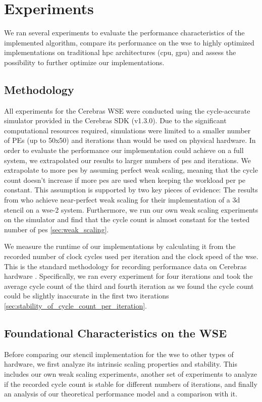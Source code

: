 \chapter{Experiments}
\label{sec:experiments}
We ran several experiments to evaluate the performance characteristics of the implemented algorithm, compare its performance on the \ac{wse} to highly optimized implementations on traditional \ac{hpc} architectures (\ac{cpu}, \ac{gpu}) and assess the possibility to further optimize our implementations.

\section{Methodology}
All experiments for the Cerebras WSE were conducted using the cycle-accurate simulator provided in the Cerebras SDK (v1.3.0).
Due to the significant computational resources required, simulations were limited to a smaller number of PEs (up to 50x50) and iterations than would be used on physical hardware.
In order to evaluate the performance our implementation could achieve on a full system, we extrapolated our results to larger numbers of \acp{pe} and iterations.
We extrapolate to more \acp{pe} by assuming perfect weak scaling, meaning that the cycle count doesn't increase if more \acp{pe} are used when keeping the workload per \ac{pe} constant.
This assumption is supported by two key pieces of evidence: The results from \citeauthor{jacquelin2022scalable} \cite{jacquelin2022scalable} who achieve near-perfect weak scaling for their implementation of a 3d stencil on a \ac{wse}-2 system.
Furthermore, we run our own weak scaling experiments on the simulator and find that the cycle count is almost constant for the tested number of \acp{pe} \autoref{sec:weak_scaling}.

We measure the runtime of our implementations by calculating it from the recorded number of clock cycles used per iteration and the clock speed of the \ac{wse}. This is the standard methodology for recording performance data on Cerebras hardware \cite{jacquelin2022scalable}.
Specifically, we ran every experiment for four iterations and took the average cycle count of the third and fourth iteration as we found the cycle count could be slightly inaccurate in the first two iterations \autoref{sec:stability_of_cycle_count_per_iteration}.

\section{Foundational Characteristics on the WSE}
Before comparing our stencil implementation for the \ac{wse} to other types of hardware, we first analyze its intrinsic scaling properties and stability.
This includes our own weak scaling experiments, another set of experiments to analyze if the recorded cycle count is stable for different numbers of iterations, and finally an analysis of our theoretical performance model and a comparison with it. 

